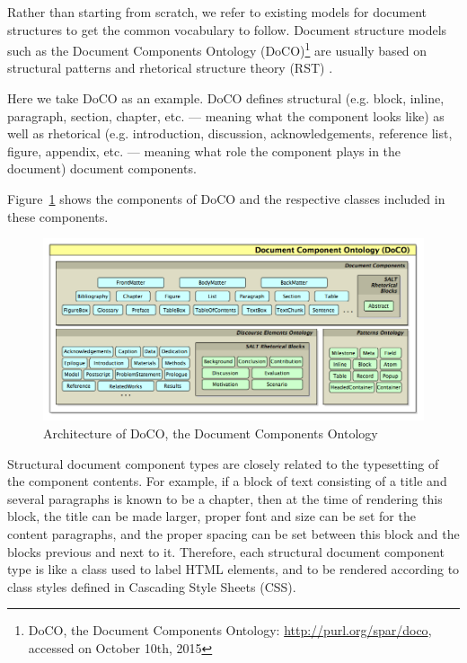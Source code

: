 Rather than starting from scratch, we refer to existing models for document structures to get the common vocabulary to follow. Document structure models such as the Document Components Ontology (DoCO)\footnote{DoCO, the Document Components Ontology: \url{http://purl.org/spar/doco}, accessed on October 10th, 2015} are usually based on structural patterns \cite{di2014dealing} and rhetorical structure theory (RST) \cite{taboada2006rhetorical}.

Here we take DoCO as an example. DoCO defines structural (e.g. block, inline, paragraph, section, chapter, etc. --- meaning what the component looks like) as well as rhetorical (e.g. introduction, discussion, acknowledgements, reference list, figure, appendix, etc. --- meaning what role the component plays in the document) document components.

Figure~\ref{fig:doco} shows the components of DoCO and the respective classes included in these components.
\begin{figure}[h]
	\includegraphics[width=\textwidth]{doco-architecture.png}
	\caption[Architecture of DoCO]{Architecture of DoCO, the Document Components Ontology}
	\label{fig:doco}
\end{figure}

Structural document component types are closely related to the typesetting of the component contents. For example, if a block of text consisting of a title and several paragraphs is known to be a chapter, then at the time of rendering this block, the title can be made larger, proper font and size can be set for the content paragraphs, and the proper spacing can be set between this block and the blocks previous and next to it. Therefore, each structural document component type is like a class used to label HTML elements, and to be rendered according to class styles defined in Cascading Style Sheets (CSS).

